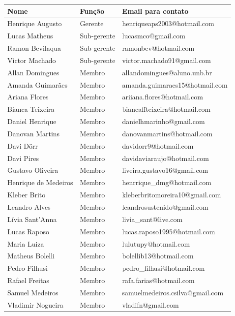 \begin{center}
    \begin{tabular}{| l | l | l |}
    \hline
Nome	&	Função	&	Email para contato	\\ \hline
Henrique Augusto	&	Gerente	&	henriqueaps2003@hotmail.com	\\ \hline
Lucas Matheus	&	Sub-gerente	&	lucasmco@gmail.com	\\ \hline
Ramon Bevilaqua	&	Sub-gerente	&	ramonbev@hotmail.com	\\ \hline
Victor Machado	&	Sub-gerente	&	victor.machado91@gmail.com	\\ \hline
Allan Domingues	&	Membro	&	allandomingues@aluno.unb.br	\\ \hline
Amanda Guimarães	&	Membro	&	amanda.guimaraes15@hotmail.com	\\ \hline
Ariana Flores	&	Membro	&	ariiana.flores@hotmail.com	\\ \hline
Bianca Teixeira	&	Membro	&	biancaffteixeira@hotmail.com	\\ \hline
Daniel Henrique	&	Membro	&	danielhmarinho@gmail.com	\\ \hline
Danovan Martins	&	Membro	&	danovanmartins@hotmail.com	\\ \hline
Davi Dörr	&	Membro	&	davidorr9@hotmail.com	\\ \hline
Davi Pires	&	Membro	&	davidaviaraujo@hotmail.com	\\ \hline
Gustavo Oliveira	&	Membro	&	liveira.gustavo16@gmail.com	\\ \hline
Henrique de Medeiros	&	Membro	&	henrrique_dmg@hotmail.com	\\ \hline
Kleber Brito	&	Membro	&	kleberbritomoreira10@gmail.com	\\ \hline
Leandro Alves	&	Membro	&	leandrosustenido@gmail.com	\\ \hline
Lívia Sant’Anna	&	Membro	&	livia_sant@live.com	\\ \hline
Lucas Raposo	&	Membro	&	lucas.raposo1995@hotmail.com	\\ \hline
Maria Luiza	&	Membro	&	lulutupy@hotmail.com	\\ \hline
Matheus Bolelli	&	Membro	&	bolellib13@hotmail.com	\\ \hline
Pedro Filhusi	&	Membro	&	pedro_filhusi@hotmail.com	\\ \hline
Rafael Freitas	&	Membro	&	rafa.farias@hotmail.com	\\ \hline
Samuel Medeiros	&	Membro	&	samuelmedeiros.csilva@gmail.com	\\ \hline
Vladimir Nogueira	&	Membro	&	vladifn@gmail.com	\\

    \hline
    \end{tabular}
\end{center}

